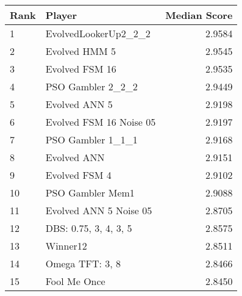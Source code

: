 \begin{tabular}{llr}
\toprule
Rank &                  Player &  Median Score \\
\midrule
1 & EvolvedLookerUp2\_2\_2 &  2.9584 \\
2 & Evolved HMM 5 &           2.9545 \\
3 & Evolved FSM 16 &          2.9535 \\
4 & PSO Gambler 2\_2\_2 &     2.9449 \\
5 & Evolved ANN 5 &           2.9198 \\
6 & Evolved FSM 16 Noise 05 & 2.9197 \\
7 & PSO Gambler 1\_1\_1 &     2.9168 \\
8 & Evolved ANN &             2.9151 \\
9 & Evolved FSM 4 &           2.9102 \\
10 & PSO Gambler Mem1 &       2.9088 \\
11 & Evolved ANN 5 Noise 05 & 2.8705 \\
12 & DBS: 0.75, 3, 4, 3, 5 &  2.8575 \\
13 & Winner12 &               2.8511 \\
14 & Omega TFT: 3, 8 &        2.8466 \\
15 & Fool Me Once &           2.8450 \\
\bottomrule
\end{tabular}
